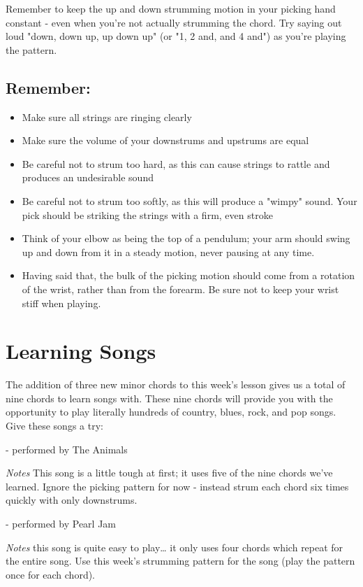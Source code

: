 Remember to keep the up and down strumming motion in your picking hand constant
- even when you're not actually strumming the chord. Try saying out loud "down,
down up, up down up" (or "1, 2 and, and 4 and") as you're playing the pattern.

\subsection{Remember:}
\begin{itemize}
\item Make sure all strings are ringing clearly
\item Make sure the volume of your downstrums and upstrums are equal
\item Be careful not to strum too hard, as this can cause strings to rattle and
      produces an undesirable sound
\item Be careful not to strum too softly, as this will produce a "wimpy" sound.
      Your pick should be striking the strings with a firm, even stroke
\item Think of your elbow as being the top of a pendulum; your arm should swing
      up and down from it in a steady motion, never pausing at any time.
\item Having said that, the bulk of the picking motion should come from a
      rotation of the wrist, rather than from the forearm. Be sure not to keep your
      wrist stiff when playing.
\end{itemize}

\section{Learning Songs}
The addition of three new minor chords to this week's lesson gives us a total
of nine chords to learn songs with. These nine chords will provide you with the
opportunity to play literally hundreds of country, blues, rock, and pop songs.
Give these songs a try:

 - performed by The Animals

\emph{Notes} This song is a little tough at first; it uses five of the nine
chords we've learned. Ignore the picking pattern for now - instead strum each
chord six times quickly with only downstrums.

 - performed by Pearl Jam

\emph{Notes} this song is quite easy to play\ldots{} it only uses four chords
which repeat for the entire song. Use this week's strumming pattern for the
song (play the pattern once for each chord).

